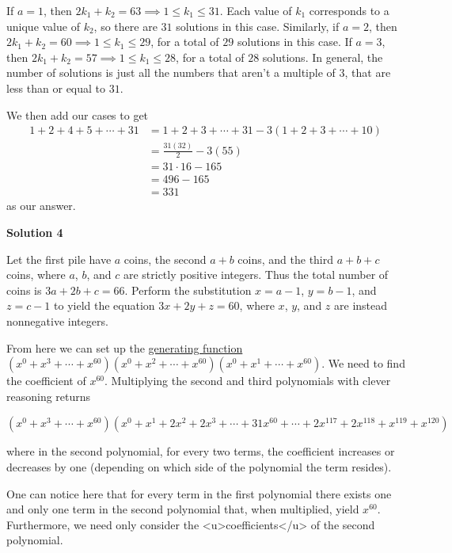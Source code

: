 \begin{enumerate}
 If $a = 1$, then $2k_1 + k_2 = 63 \implies 1 \leq k_1 \leq 31$. Each value of $k_1$ corresponds to a unique value of $k_2$, so there are $31$ solutions in this case. Similarly, if $a = 2$, then $2k_1 + k_2 = 60 \implies 1 \leq k_1 \leq 29$, for a total of $29$ solutions in this case. If $a = 3$, then $2k_1 + k_2 = 57 \implies 1 \leq k_1 \leq 28$, for a total of $28$ solutions. In general, the number of solutions is just all the numbers that aren't a multiple of $3$, that are less than or equal to $31$. 

 We then add our cases to get 
 \begin{align*} 1 + 2 + 4 + 5 + \cdots + 31 &= 1 + 2 + 3 + \cdots + 31 - 3(1 + 2 + 3 + \cdots + 10) \\ &= \frac{31(32)}{2} - 3(55) \\ &= 31 \cdot 16 - 165 \\ &= 496 - 165 \\ &= \boxed{331} \end{align*}
as our answer.

 



\textbf{Solution 4}

Let the first pile have $a$ coins, the second $a+b$ coins, and the third $a+b+c$ coins, where $a$, $b$, and $c$ are strictly positive integers. Thus the total number of coins is $3a+2b+c=66$. Perform the substitution $x=a-1$, $y=b-1$, and $z=c-1$ to yield the equation $3x+2y+z=60$, where $x$, $y$, and $z$ are instead nonnegative integers.

 From here we can set up the \href{https://artofproblemsolving.com/wiki/index.php?title=Generating\_function}{generating function} $(x^0+x^3+\cdots+x^{60})(x^0+x^2+\cdots+x^{60})(x^0+x^1+\cdots+x^{60})$. We need to find the coefficient of $x^{60}$. Multiplying the second and third polynomials with clever reasoning returns

 $(x^0+x^3+\cdots+x^{60})(x^0+x^1+2x^2+2x^3+\cdots+31x^{60}+\cdots+2x^{117}+2x^{118}+x^{119}+x^{120})$

 where in the second polynomial, for every two terms, the coefficient increases or decreases by one (depending on which side of the polynomial the term resides).

 One can notice here that for every term in the first polynomial there exists one and only one term in the second polynomial that, when multiplied, yield $x^{60}$. Furthermore, we need only consider the <u>coefficients</u> of the second polynomial.


\end{enumerate}
